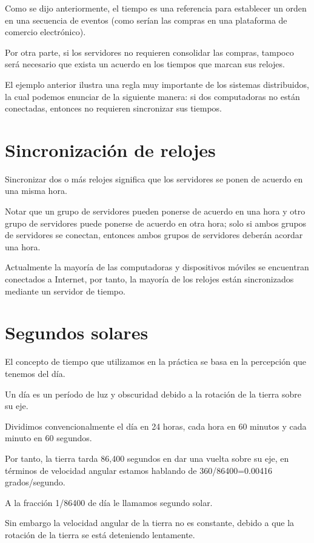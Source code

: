 Como se dijo anteriormente, el tiempo es una referencia para establecer un orden en una secuencia de eventos (como serían las compras en una plataforma de comercio electrónico).

Por otra parte, si los servidores no requieren consolidar las compras, tampoco será necesario que exista un acuerdo en los tiempos que marcan sus relojes.

El ejemplo anterior ilustra una regla muy importante de los sistemas distribuidos, la cual podemos enunciar de la siguiente manera: si dos computadoras no están conectadas, entonces no requieren sincronizar sus tiempos.

\section{Sincronización de relojes}

Sincronizar dos o más relojes significa que los servidores se ponen de acuerdo en una misma hora.

Notar que un grupo de servidores pueden ponerse de acuerdo en una hora y otro grupo de servidores puede ponerse de acuerdo en otra hora; solo si ambos grupos de servidores se conectan, entonces ambos grupos de servidores deberán acordar una hora.

Actualmente la mayoría de las computadoras y dispositivos móviles se encuentran conectados a Internet, por tanto, la mayoría de los relojes están sincronizados mediante un servidor de tiempo.

\section{Segundos solares}

El concepto de tiempo que utilizamos en la práctica se basa en la percepción que tenemos del día.

Un día es un período de luz y obscuridad debido a la rotación de la tierra sobre su eje.

Dividimos convencionalmente el día en 24 horas, cada hora en 60 minutos y cada minuto en 60 segundos.

Por tanto, la tierra tarda 86,400 segundos en dar una vuelta sobre su eje, en términos de velocidad angular estamos hablando de 360/86400=0.00416 grados/segundo.

A la fracción 1/86400 de día le llamamos segundo solar.

Sin embargo la velocidad angular de la tierra no es constante, debido a que la rotación de la tierra se está deteniendo lentamente.

